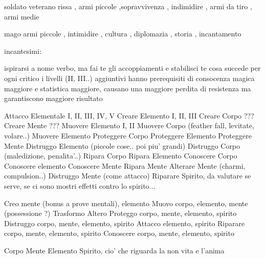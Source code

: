 \documentclass[12pt,a4paper,twoside,openany,twocolumn]{book}
\begin{document}
soldato veterano
rissa , armi piccole  ,sopravvivenza , indimidire , armi da tiro , armi medie 

mago
armi piccole , intimidire , cultura , diplomazia , storia , incantamento 


incantesimi:

ispirarsi a nome verbo, ma fai te gli accoppiamenti e stabilisci te cosa succede per ogni critico 
i livelli (II, III..) aggiuntivi hanno prerequisiti di consocenza magica maggiore e statistica maggiore, causano una maggiore perdita di resistenza ma garantiscono maggiore risultato

Attacco Elementale I, II, III, IV, V
Creare Elemento I, II, III
Creare Corpo  ???
Creare Mente  ???
Muovere Elemento I, II
Muovere Corpo (feather fall, levitate, volare..)
Muovere Elemento
Proteggere Corpo
Proteggere Elemento 
Proteggere Mente
Distruggo Elemento (piccole cose.. poi piu' grandi)
Distruggo Corpo (maledizione, penalita'..)
Ripara Corpo
Ripara Elemento
Conoscere Corpo
Conoscere elemento
Conoscere Mente
Ripara Mente
Alterare Mente (charmi, compulsion..)
Distruggo Mente (come attacco)
Riparare Spirito, da valutare se serve, se ci sono mostri effetti contro lo spirito...


Creo		mente (bonus a prove mentali), elemento
Muovo		corpo, elemento, mente (possessione ?)
Trasformo	
Altero
Proteggo	corpo, mente, elemento, spirito
Distruggo	corpo, mente, elemento, spirito
Attacco		elemento, spirito
Riparare	corpo, mente, elemento, spirito
Conoscere	corpo, mente, elemento, spirito

Corpo
Mente
Elemento
Spirito, cio' che riguarda la non vita e l'anima
\end{document}
